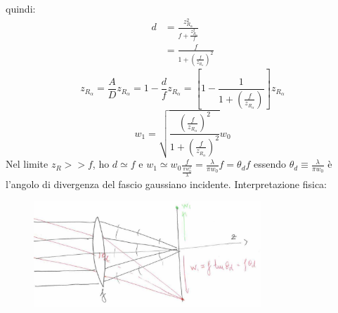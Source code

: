 \documentclass{book}
\def \l {\lambda}
\theoremstyle{remark}
\begin{document}
quindi:
\begin{align*}
d &= \frac{z_{R_\alpha}^2}{f + \frac{z_{R_\alpha}^2}{f}}\\
&= \frac{f}{1 + \left(\frac{f}{z_{R_\alpha}}\right)^2}
\end{align*}
\begin{equation*}
z_{R_\alpha} = \frac{A}{D}z_{R_\alpha} = 1 - \frac{d}{f} z_{R_\alpha} = \left[ 1 - \frac{1}{1 + \left( \frac{f}{z_{R_\alpha}}\right)}\right] z_{R_\alpha}
\end{equation*}
\begin{equation*}
w_1 = \sqrt{\frac{\left(\frac{f}{z_{R_\alpha}}\right)^2}{1 + \left( \frac{f}{z_{R_\alpha}}\right)^2}} w_0
\end{equation*}
Nel limite $z_R >> f$, ho $d \simeq f$ e $w_1 \simeq w_0 \frac{f}{\frac{\pi w_0^2}{\l}} = \frac{\l}{\pi w_0}f = \theta_d f$ essendo $\theta_d \equiv \frac{\l}{\pi w_0}$ è l'angolo di divergenza del fascio gaussiano incidente.
Interpretazione fisica:
\begin{figure}[H]
\centering
\includegraphics[height=4cm]{images/4}
\end{figure}
\end{document}
